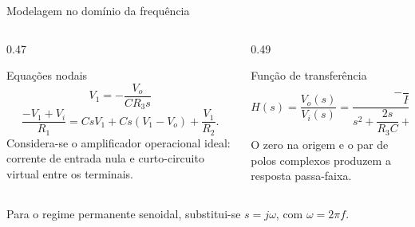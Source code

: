 \begin{frame}{Modelagem no domínio da frequência}
  \small
  \begin{columns}[T,onlytextwidth]
    \begin{column}{0.47\textwidth}
      \begin{block}{Equações nodais}
        \[
          V_1=-\frac{V_o}{CR_3s}
        \]
        \[
          \frac{-V_1+V_i}{R_1}
          =CsV_1+Cs(V_1-V_o)+\frac{V_1}{R_2}.
        \]
        Considera-se o amplificador operacional ideal: corrente de entrada nula e
        curto-circuito virtual entre os terminais.
      \end{block}
    \end{column}
    \begin{column}{0.49\textwidth}
      \begin{alertblock}{Função de transferência}
        \[
          H(s)=\frac{V_o(s)}{V_i(s)}
          =\frac{-\dfrac{s}{R_1C}}
          {s^2+\dfrac{2s}{R_3C}
          +\dfrac{R_1+R_2}{R_1R_2R_3C^2}}.
        \]
        O zero na origem e o par de polos complexos produzem a resposta passa-faixa.
      \end{alertblock}
    \end{column}
  \end{columns}

  \vspace{0.12cm}
  \centering
  \alert{Para o regime permanente senoidal, substitui-se $s=j\omega$, com $\omega=2\pi f$.}
\end{frame}